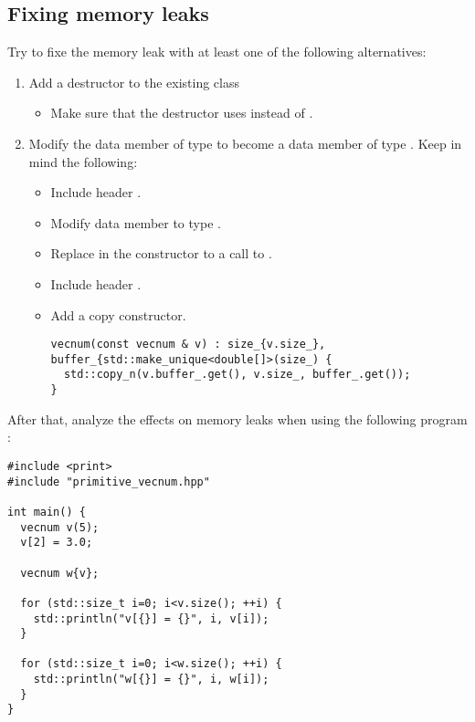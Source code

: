 \subsection{Fixing memory leaks}

Try to fixe the memory leak with at least one of the following alternatives:

\begin{enumerate}

\item 
Add a destructor to the existing class
\begin{itemize}
  \item Make sure that the destructor uses
          
        instead of  .
\end{itemize}

\item 
Modify the data member of type  
to become a data member of type
.
Keep in mind the following:

\begin{itemize}
  \item Include header .

  \item Modify data member  to type .

  \item Replace  in the constructor to a call to 
        .

  \item Include header .

  \item Add a copy constructor.

\begin{lstlisting}
vecnum(const vecnum & v) : size_{v.size_}, buffer_{std::make_unique<double[]>(size_) {
  std::copy_n(v.buffer_.get(), v.size_, buffer_.get());
}
\end{lstlisting}
\end{itemize}

\end{enumerate}

After that, analyze the effects on memory leaks when using the following
program 
:

\begin{lstlisting}
#include <print>
#include "primitive_vecnum.hpp"

int main() {
  vecnum v(5);
  v[2] = 3.0;

  vecnum w{v};

  for (std::size_t i=0; i<v.size(); ++i) {
    std::println("v[{}] = {}", i, v[i]);
  }

  for (std::size_t i=0; i<w.size(); ++i) {
    std::println("w[{}] = {}", i, w[i]);
  }
}
\end{lstlisting}

